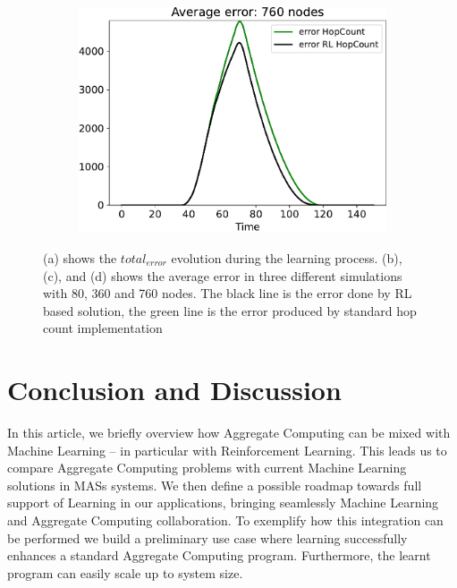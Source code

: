 \documentclass[conference]{IEEEtran}
\newcommand{\todos}[1]{\todo[inline, color=cyan]{\textbf{TODO}: #1}}
\begin{document}
\begin{figure}
\begin{subfigure}[b]{0.3\textwidth}
      \includegraphics[width=\textwidth]{img/760}
      \caption{}
      \label{fig:simulation-d}
  \end{subfigure}
  \caption{ (a) shows the $total_{error}$ evolution during the learning process. (b), (c), and (d) shows the average error in three different simulations with 80, 360 and 760 nodes. 
  The black line is the error done by RL based solution, 
  the green line is the error produced by standard hop count implementation}
  \label{fig:simulation}
\end{figure}

\section{Conclusion and Discussion}
In this article, we briefly overview how Aggregate Computing can be mixed with Machine Learning -- 
 in particular with Reinforcement Learning. 
 This leads us to compare Aggregate Computing problems with current Machine Learning solutions in MASs systems.
%
We then define a possible roadmap towards full support of Learning in our applications, 
 bringing seamlessly Machine Learning and Aggregate Computing collaboration.
%
To exemplify how this integration can be performed we build a preliminary use case where 
 learning successfully enhances a standard Aggregate Computing program.
Furthermore, the learnt program can easily scale up to system size.
\end{document}

